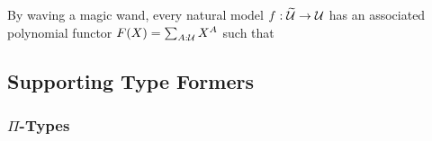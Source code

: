 \documentclass{amsart}
\begin{document}
By waving a magic wand, every natural model $f : \widetilde{\mathcal{U}} \to \mathcal{U}$ has an associated polynomial functor $F(X) = \sum_{A : \mathcal{U}}X^{A}$ such that

\subsection{Supporting Type Formers}
\label{sec:nm-supporting-type-formers}

\subsubsection{$\Pi$-Types}
\label{sec:nm-pi-types}
\end{document}
